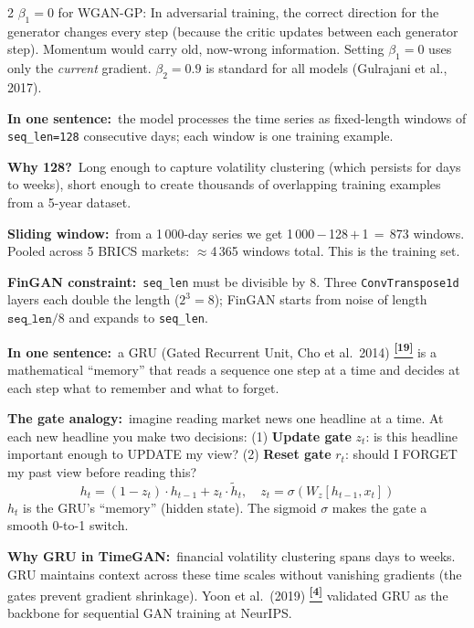 \documentclass[10pt]{article}
\newcommand{\navybox}[2]{\begin{tcolorbox}[mybox={Navy}{LBg},title={#1}]#2\end{tcolorbox}}
\newcommand{\greenbox}[2]{\begin{tcolorbox}[mybox={FGreen}{GBg},title={#1}]#2\end{tcolorbox}}
\newcommand{\tcite}[1]{%
  \hyperlink{R:#1}{\textsuperscript{\scriptsize\textbf{[#1]}}}}
\begin{document}
\begin{multicols}{2}
{\smallskip
$\beta_1 = 0$ for WGAN-GP: In adversarial training, the correct direction for the generator changes every step (because the critic updates between each generator step). Momentum would carry old, now-wrong information. Setting $\beta_1=0$ uses only the \emph{current} gradient. $\beta_2=0.9$ is standard for all models (Gulrajani et al., 2017).}

\greenbox{seq\_len: What Counts as One Training Example?}{%
\textbf{In one sentence:}\ the model processes the time series as fixed-length windows of \texttt{seq\_len=128} consecutive days; each window is one training example.

\smallskip
\textbf{Why 128?}\ Long enough to capture volatility clustering (which persists for days to weeks), short enough to create thousands of overlapping training examples from a 5-year dataset.

\smallskip
\textbf{Sliding window:}\ from a 1\,000-day series we get 1\,000\,$-$\,128\,$+$\,1\,$=$\,873 windows. Pooled across 5 BRICS markets: $\approx$4\,365 windows total. This is the training set.

\smallskip
\textbf{FinGAN constraint:}\ \texttt{seq\_len} must be divisible by 8. Three \texttt{ConvTranspose1d} layers each double the length ($2^3=8$); FinGAN starts from noise of length $\texttt{seq\_len}/8$ and expands to \texttt{seq\_len}.}

\columnbreak

\navybox{GRU: Memory Cells for Sequential Data (TimeGAN)}{%
\textbf{In one sentence:}\ a GRU (Gated Recurrent Unit, Cho et al.\ 2014)\tcite{19} is a mathematical ``memory'' that reads a sequence one step at a time and decides at each step what to remember and what to forget.

\smallskip
\textbf{The gate analogy:}\ imagine reading market news one headline at a time. At each new headline you make two decisions: (1) \textbf{Update gate} $z_t$: is this headline important enough to UPDATE my view? (2) \textbf{Reset gate} $r_t$: should I FORGET my past view before reading this?
\[h_t = (1-z_t)\cdot h_{t-1} + z_t \cdot \tilde{h}_t, \quad z_t = \sigma(W_z[h_{t-1},x_t])\]
$h_t$ is the GRU's ``memory'' (hidden state). The sigmoid $\sigma$ makes the gate a smooth 0-to-1 switch.

\smallskip
\textbf{Why GRU in TimeGAN:}\ financial volatility clustering spans days to weeks. GRU maintains context across these time scales without vanishing gradients (the gates prevent gradient shrinkage). Yoon et al.\ (2019)\tcite{4} validated GRU as the backbone for sequential GAN training at NeurIPS.}


\end{multicols}
\end{document}
